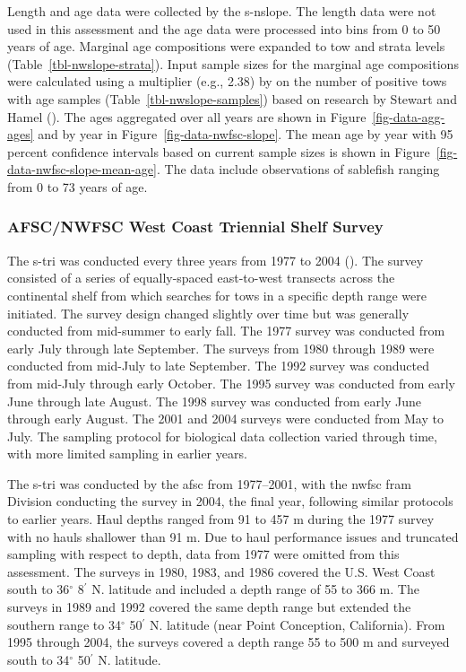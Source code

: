 \documentclass[
  english,
]{article}
\begin{document}
Length and age data were collected by the \gls{s-nslope}. The length
data were not used in this assessment and the age data were processed
into bins from 0 to 50 years of age. Marginal age compositions were
expanded to tow and strata levels (Table~\ref{tbl-nwslope-strata}).
Input sample sizes for the marginal age compositions were calculated
using a multiplier (e.g., 2.38) by on the number of positive tows with
age samples (Table~\ref{tbl-nwslope-samples}) based on research by
Stewart and Hamel (). The
ages aggregated over all years are shown in
Figure~\ref{fig-data-agg-ages} and by year in
Figure~\ref{fig-data-nwfsc-slope}. The mean age by year with 95 percent
confidence intervals based on current sample sizes is shown in
Figure~\ref{fig-data-nwfsc-slope-mean-age}. The data include
observations of sablefish ranging from 0 to 73 years of age.

\subsubsection{AFSC/NWFSC West Coast Triennial Shelf
Survey}\label{tri-data}

The \gls{s-tri} was conducted every three years from 1977 to 2004
(). The
survey consisted of a series of equally-spaced east-to-west transects
across the continental shelf from which searches for tows in a specific
depth range were initiated. The survey design changed slightly over time
but was generally conducted from mid-summer to early fall. The 1977
survey was conducted from early July through late September. The surveys
from 1980 through 1989 were conducted from mid-July to late September.
The 1992 survey was conducted from mid-July through early October. The
1995 survey was conducted from early June through late August. The 1998
survey was conducted from early June through early August. The 2001 and
2004 surveys were conducted from May to July. The sampling protocol for
biological data collection varied through time, with more limited
sampling in earlier years.

The \gls{s-tri} was conducted by the \gls{afsc} from 1977--2001, with
the \gls{nwfsc} \gls{fram} Division conducting the survey in 2004, the
final year, following similar protocols to earlier years. Haul depths
ranged from 91 to 457 m during the 1977 survey with no hauls shallower
than 91 m. Due to haul performance issues and truncated sampling with
respect to depth, data from 1977 were omitted from this assessment. The
surveys in 1980, 1983, and 1986 covered the U.S. West Coast south to
36\(^\circ\) 8\(^\prime\) N. latitude and included a depth range of 55
to 366 m. The surveys in 1989 and 1992 covered the same depth range but
extended the southern range to 34\(^\circ\) 50\(^\prime\) N. latitude
(near Point Conception, California). From 1995 through 2004, the surveys
covered a depth range 55 to 500 m and surveyed south to 34\(^\circ\)
50\(^\prime\) N. latitude.
\end{document}
